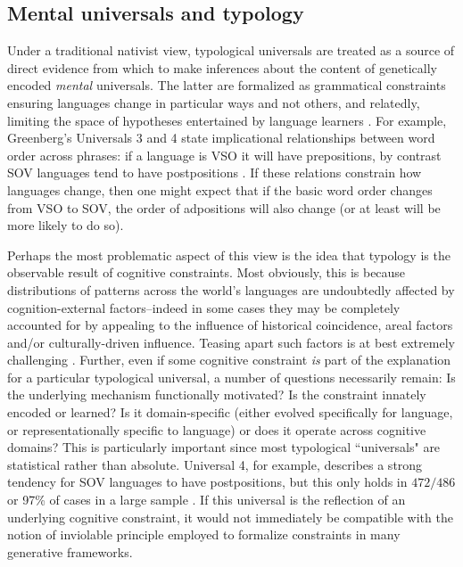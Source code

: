 \documentclass[output=paper]{langsci/langscibook}
\begin{document}
\subsection{Mental universals and typology}
 
Under a traditional nativist view, typological universals are treated as a source of direct evidence from which to make inferences about the content of genetically encoded \textit{mental} universals. The latter are formalized as grammatical constraints ensuring languages change in particular ways and not others, and relatedly, limiting the space of hypotheses entertained by language learners \citep[e.g.,][]{lightfoot89,Baker01}. %
 For example, Greenberg's Universals 3 and 4 state implicational relationships between word order across phrases: if a language is VSO it will have prepositions, by contrast SOV languages tend to have postpositions \citep{Greenberg63}. If these relations constrain how languages change, then one might expect that if the basic word order changes from VSO to SOV, the order of adpositions will also change (or at least will be more likely to do so). 

Perhaps the most problematic aspect of this view is the idea that typology is the observable result of cognitive constraints. Most obviously, this is because distributions of patterns across the world's languages are undoubtedly affected by cognition-external factors--indeed in some cases they may be completely accounted for by appealing to the influence of historical coincidence, areal factors and/or culturally-driven influence. Teasing apart such factors is at best extremely challenging \citep{cysouw2005probabilistic, ladd2014correlational, piantadosi2014quantitative}. Further, even if some cognitive constraint \textit{is} part of the explanation for a particular typological universal, a number of questions necessarily remain: Is the underlying mechanism functionally motivated? Is the constraint innately encoded  or learned? Is it domain-specific (either evolved specifically for language, or representationally specific to language) or does it operate across cognitive domains? This is particularly important since most   typological ``universals" are statistical rather than absolute. Universal 4, for example, describes a strong tendency for SOV languages to have postpositions, but this only holds in $472/486$ or 97\% of cases in a large sample \citep{dryer2013relationship}. If this universal is the reflection of an underlying cognitive constraint, it would not immediately be compatible with the notion of inviolable principle employed to formalize constraints in many generative frameworks. 
\end{document}
